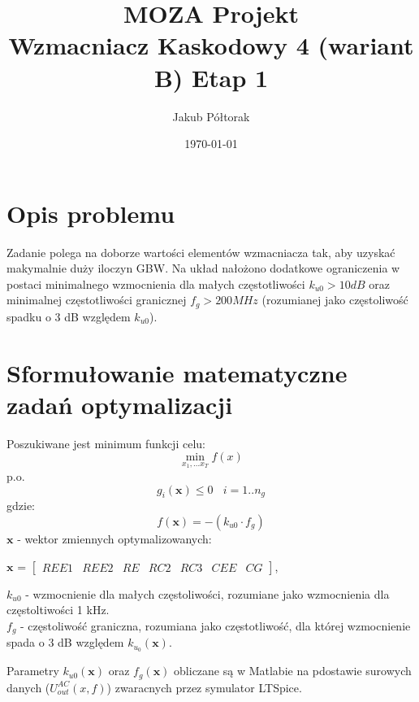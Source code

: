 \documentclass{article}
\title{\huge  \Huge \textbf{MOZA Projekt} \\ \textbf{Wzmacniacz Kaskodowy 4 (wariant B)}}
\date{\today}
\author{ \LARGE Jakub Półtorak}
\begin{document}
\maketitle
{}
\newpage
{}
\tableofcontents

\pagebreak

\begin{center}
	\title{ \huge \textbf{Etap 1}}
\end{center}


\section{Opis problemu}
Zadanie polega na doborze wartości elementów wzmacniacza tak, aby uzyskać makymalnie duży iloczyn
GBW. Na układ nałożono dodatkowe ograniczenia w postaci minimalnego wzmocnienia dla małych częstotliwości $k_{u0} > 10 dB$ oraz minimalnej częstotliwości
granicznej $f_g > 200 MHz$ (rozumianej jako częstoliwość spadku o 3 dB względem $k_{u0}$).
\section{Sformułowanie matematyczne zadań optymalizacji}
Poszukiwane jest minimum funkcji celu:
\[ \min\limits_{x_1,\dots x_T} f(x) \]
p.o.
\[ g_{i}(\textbf{x}) \leq 0 \ \ \ \  i=1..n_g\]
gdzie:
\[ f(\textbf{x}) = -(k_{u0}\cdot f_g)\]
\(\textbf{x}\) - wektor zmiennych optymalizowanych: \\
\begin{center}
	$\textbf{x}$ =
	$\begin{bmatrix}
			REE1 & REE2 & RE & RC2 & RC3 & CEE & CG
		\end{bmatrix}$,
\end{center}
\(k_{u0}\) - wzmocnienie dla małych częstoliwości, rozumiane jako wzmocnienia dla częstoltiwości 1 kHz.\\
\(f_{g}\) - częstoliwość graniczna, rozumiana jako częstotliwość, dla której wzmocnienie
spada o 3 dB względem $k_{u_{0}}(\textbf{x}) $.

Parametry $k_{u0}(\textbf{x})$ oraz $f_g(\textbf{x})$ obliczane są w Matlabie na pdostawie surowych danych ($U^{AC}_{out}(x,f)$) zwaracnych
przez symulator LTSpice.
\end{document}
